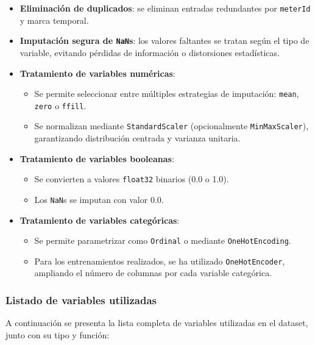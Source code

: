 \begin{itemize}
	\item \textbf{Eliminación de duplicados}: se eliminan entradas redundantes por \texttt{meterId} y marca temporal.
	\item \textbf{Imputación segura de \texttt{NaN}s}: los valores faltantes se tratan según el tipo de variable, evitando pérdidas de información o distorsiones estadísticas.
	\item \textbf{Tratamiento de variables numéricas}:
	\begin{itemize}
		\item Se permite seleccionar entre múltiples estrategias de imputación: \texttt{mean}, \texttt{zero} o \texttt{ffill}.
		\item Se normalizan mediante \texttt{StandardScaler} (opcionalmente \texttt{MinMaxScaler}), garantizando distribución centrada y varianza unitaria.
	\end{itemize}
	\item \textbf{Tratamiento de variables booleanas}:
	\begin{itemize}
		\item Se convierten a valores \texttt{float32} binarios (0.0 o 1.0).
		\item Los \texttt{NaN}s se imputan con valor 0.0.
	\end{itemize}
	\item \textbf{Tratamiento de variables categóricas}:
	\begin{itemize}
		\item Se permite parametrizar como \texttt{Ordinal} o mediante \texttt{OneHotEncoding}.
		\item Para los entrenamientos realizados, se ha utilizado \texttt{OneHotEncoder}, ampliando el número de columnas por cada variable categórica.
	\end{itemize}
\end{itemize}

\subsubsection*{Listado de variables utilizadas}

A continuación se presenta la lista completa de variables utilizadas en el dataset, junto con su tipo y función:

